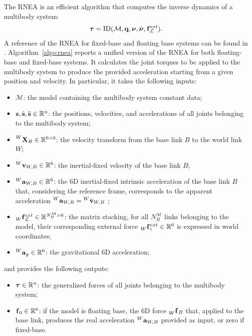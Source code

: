 The \ac{RNEA} is an efficient algorithm that computes the inverse dynamics of a multibody system:
%
\begin{equation*}
    \boldsymbol{\tau} = \operatorname{ID}(\mathcal{M}, \mathbf{q}, \boldsymbol{\nu}, \dot{\boldsymbol{\nu}}, \forcesix^{ext}_\mathcal{L})
    .
\end{equation*}
%
A reference of the \ac{RNEA} for fixed-base and floating base systems can be found in \parencite[Section~5.3 and Section~9.5]{featherstone_rigid_2008}.
Algorithm~\ref{algo:rnea} reports a unified version of the \ac{RNEA} for both floating-base and fixed-base systems.
It calculates the joint torques to be applied to the multibody system to produce the provided acceleration starting from a given position and velocity.
In particular, it takes the following inputs:
%
\begin{itemize}
    \item $\mathcal{M}$: the model containing the multibody system constant data;
    \item $\Shape, \Shaped, \Shapedd \in \realn^n$: the positions, velocities, and accelerations of all joints belonging to the multibody system;
    \item $\transvel[W]_B \in \realn^{6\times6}$: the velocity transform from the base link $B$ to the world link $W$;
    \item $\velsix[W]_{W,B} \in \realn^6$: the inertial-fixed velocity of the base link $B$;
    \item $\accsix[W]_{W,B} \in \realn^6$: the 6D inertial-fixed intrinsic acceleration of the base link $B$ that, considering the reference frame, corresponds to the apparent acceleration $\accsix[W]_{W,B} = {}^W \dot{\mathbf{v}}_{W,B}$ ;
    \item $\forcesix[W]^{ext}_\mathcal{L} \in \realn^{N_B^\mathcal{M} \times 6}$: the matrix stacking, for all $N_B^\mathcal{M}$ links belonging to the model, their corresponding external force $\forcesix[W]_i^{ext} \in \realn^6$ is expressed in world coordinates;
    \item $\accsix[W]_g \in \realn^6$: the gravitational 6D acceleration;
\end{itemize}
%
and provides the following outputs:
%
\begin{itemize}
    \item $\Torques \in \realn^n$: the generalized forces of all joints belonging to the multibody system;
    \item $\forcesix_0 \in \realn^6$: if the model is floating base, the 6D force $\forcesix[W]_B$ that, applied to the base link, produces the real acceleration $\accsix[W]_{W,B}$ provided as input, or zero if fixed-base.
\end{itemize}


